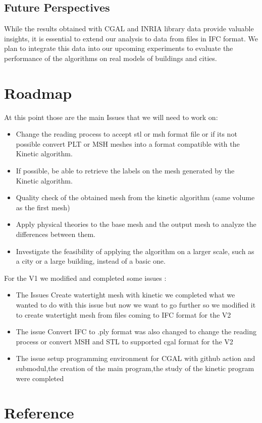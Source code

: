 \documentclass{article}
\begin{document}
\subsection*{Future Perspectives}

    While the results obtained with CGAL and INRIA library data provide valuable 
    insights, it is essential to extend our analysis to data from files in IFC format.
    We plan to integrate this data into our upcoming experiments to evaluate the performance 
    of the algorithms on real models of buildings and cities.
    
\section{Roadmap}
At this point those are the main Issues that we will need to work on:
\begin{itemize}
  
  \item Change the reading process to accept stl or msh format file or if its not possible
  convert PLT or MSH meshes into a format compatible with the Kinetic algorithm.
  \item If possible, be able to retrieve the labels on the mesh generated by the Kinetic algorithm.
  \item Quality check of the obtained mesh from the kinetic algorithm (same volume as the first mesh)
  \item Apply physical theories to the base mesh and the output mesh to analyze the differences between them.
  \item Investigate the feasibility of applying the algorithm on a larger scale, such as a city or a large building, instead of a basic one.
\end{itemize}

For the V1 we modified and completed some issues :
\begin{itemize}
  \item The Issues Create watertight mesh with kinetic we completed what we wanted to do with this issue but now we want to go further so we modified it 
  to create watertight mesh from files coming to IFC format for the V2
  \item The issue Convert IFC to .ply format was also changed to change the reading process or convert MSH and STL to supported cgal format for the V2
  \item The issue setup programming environment for CGAL with github action and submodul,the creation of the main program,the study of the kinetic program were completed 
\end{itemize}

    
\nocite{*}
\section{Reference}


\end{document}
